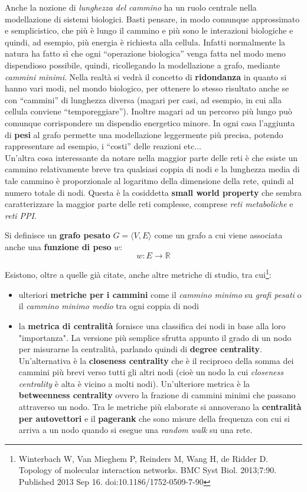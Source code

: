 \documentclass[a4paper,12pt, oneside]{book}
\begin{document}
Anche la nozione di \textit{lunghezza del cammino}  ha un ruolo centrale nella
modellazione di sistemi biologici. Basti pensare, in modo comunque approssimato
e semplicistico, che più è lungo il cammino e più sono le interazioni biologiche
e quindi, ad esempio, più energia è richiesta alla cellula. Infatti normalmente
la natura ha fatto sì che ogni ``operazione biologica'' venga fatta nel modo
meno dispendioso possibile, quindi, ricollegando la modellazione a grafo,
mediante \textit{cammini minimi}. Nella realtà si vedrà il concetto di
\textbf{ridondanza} in quanto si hanno vari modi, nel mondo biologico, per
ottenere lo stesso risultato anche se con ``cammini'' di lunghezza diversa
(magari per casi, ad esempio, in cui alla cellula conviene
``temporeggiare''). Inoltre magari ad un percorso più lungo può comunque
corrispondere un dispendio energetico minore. In ogni casa l'aggiunta di
\textbf{pesi} al grafo permette 
una modellazione leggermente più precisa, potendo rappresentare ad esempio, i
``costi'' delle reazioni etc$\ldots$\\
Un'altra cosa interessante da notare nella maggior parte delle reti è che
esiste un cammino relativamente breve tra qualsiasi coppia di nodi e la
lunghezza media di tale cammino è proporzionale al logaritmo della dimensione
della rete, quindi al numero totale di nodi. Questa è la cosiddetta
\textbf{small world property} che sembra caratterizzare la maggior parte delle
reti complesse, comprese \textit{reti metaboliche} e \textit{reti PPI}.
\begin{definizione}
  Si definisce un \textbf{grafo pesato} $G=\langle V,E\rangle$ come un grafo a
  cui viene associata anche una \textbf{funzione di peso} $w$:
  \[w:E\to\mathbb{R}\]
\end{definizione}
Esistono, oltre a quelle già citate, anche altre metriche di studio, tra
cui\footnote{Winterbach W, Van Mieghem P, Reinders M, Wang H, de Ridder
  D. Topology of molecular interaction networks. BMC Syst
  Biol. 2013;7:90. Published 2013 Sep 16. doi:10.1186/1752-0509-7-90}: 
\begin{itemize}
  \item ulteriori \textbf{metriche per i cammini} come il \textit{cammino
    minimo} su \textit{grafi pesati} o il \textit{cammino minimo medio} tra
  ogni coppia di nodi
  \item la \textbf{metrica di centralità} fornisce una classifica dei nodi in
  base alla loro "importanza". La versione più semplice sfrutta appunto il grado
  di un nodo per misurarne la centralità, parlando quindi di \textbf{degree
    centrality}. Un'alternativa è la \textbf{closeness centrality} che è il
  reciproco della somma dei cammini più brevi verso tutti gli altri nodi (cioè
  un nodo la cui \textit{closeness centrality} è alta è vicino a molti
  nodi). Un'ulteriore metrica è la \textbf{betweenness centrality} ovvero la
  frazione di cammini minimi che passano attraverso un nodo. Tra le metriche più
  elaborate si annoverano la \textbf{centralità per autovettori} e il
  \textbf{pagerank} che sono misure della frequenza con cui si arriva a un nodo
  quando si esegue una \textit{random walk} su una rete.  
\end{itemize}
\end{document}
